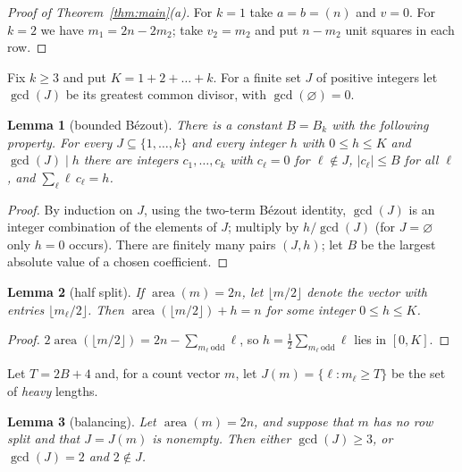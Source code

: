 \documentclass[11pt]{article}
\newtheorem{lemma}{Lemma}
\theoremstyle{definition}
\theoremstyle{remark}
\newcommand{\area}{\operatorname{area}}
\begin{document}
\begin{proof}[Proof of Theorem~\ref{thm:main}(a)]
For $k=1$ take $a=b=(n)$ and $v=0$. For $k=2$ we have $m_1=2n-2m_2$; take
$v_2=m_2$ and put $n-m_2$ unit squares in each row.
\end{proof}

Fix $k\ge3$ and put $K=1+2+\dots+k$. For a finite set $J$ of positive
integers let $\gcd(J)$ be its greatest common divisor, with $\gcd(\varnothing)=0$.

\begin{lemma}[bounded Bézout]\label{lem:bezout}
There is a constant $B=B_k$ with the following property. For every
$J\subseteq\{1,\dots,k\}$ and every integer $h$ with $0\le h\le K$ and
$\gcd(J)\mid h$ there are integers $c_1,\dots,c_k$ with $c_\ell=0$ for
$\ell\notin J$, $|c_\ell|\le B$ for all $\ell$, and $\sum_\ell \ell\,c_\ell=h$.
\end{lemma}

\begin{proof}
By induction on $J$, using the two-term Bézout identity, $\gcd(J)$ is an
integer combination of the elements of $J$; multiply by $h/\gcd(J)$ (for
$J=\varnothing$ only $h=0$ occurs). There are finitely many pairs $(J,h)$;
let $B$ be the largest absolute value of a chosen coefficient.
\end{proof}

\begin{lemma}[half split]\label{lem:half}
If $\area(m)=2n$, let $\lfloor m/2\rfloor$ denote the vector with entries
$\lfloor m_\ell/2\rfloor$. Then $\area(\lfloor m/2\rfloor)+h=n$ for some
integer $0\le h\le K$.
\end{lemma}

\begin{proof}
$2\area(\lfloor m/2\rfloor)=2n-\sum_{m_\ell\ \mathrm{odd}}\ell$, so
$h=\frac12\sum_{m_\ell\ \mathrm{odd}}\ell$ lies in $[0,K]$.
\end{proof}

Let $T=2B+4$ and, for a count vector $m$, let $J(m)=\{\ell: m_\ell\ge T\}$ be
the set of \emph{heavy} lengths.

\begin{lemma}[balancing]\label{lem:balance}
Let $\area(m)=2n$, and suppose that $m$ has no row split and that $J=J(m)$ is
nonempty. Then either $\gcd(J)\ge3$, or $\gcd(J)=2$ and $2\notin J$.
\end{lemma}
\end{document}
